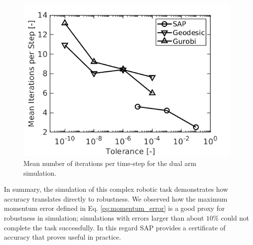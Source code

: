 \begin{figure}[!h]
	\centering
    \includegraphics[width=0.7\columnwidth]{figures/dual_arm/iterations_per_step.png}
    \caption{\label{fig:dual_arm_iterations} Mean number of iterations per
    time-step for the dual arm simulation.}
\end{figure}

In summary, the simulation of this complex robotic task demonstrates how
accuracy translates directly to robustness. We observed how the maximum momentum
error defined in Eq. \eqref{eq:momentum_error} is a good proxy for robustness in
simulation; simulations with errors larger than about $10\%$ could not complete
the task successfully. In this regard SAP provides a certificate of accuracy
that proves useful in practice.
